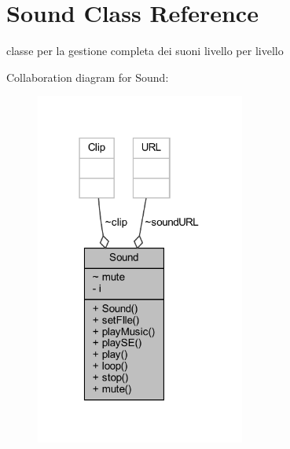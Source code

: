 \hypertarget{classprogetto_1_1_sound}{}\section{Sound Class Reference}
\label{classprogetto_1_1_sound}


classe per la gestione completa dei suoni livello per livello  




Collaboration diagram for Sound\+:\nopagebreak
\begin{figure}[H]
\begin{center}
\leavevmode
\includegraphics[width=195pt]{classprogetto_1_1_sound__coll__graph}
\end{center}
\end{figure}
